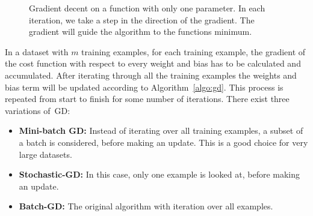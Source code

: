 \begin{figure}
\centering 
\resizebox{0.65\textwidth}{0.4\textwidth}{      

}
\caption{Gradient decent on a function with only one parameter. In each iteration, we take a step in the direction of the gradient. The gradient will guide the algorithm to the functions minimum. }
\label{fig:gradientD}
\end{figure}
\noindent
In a dataset with $m$ training examples, for each training example, the gradient of the cost function with respect to every weight and bias has to be calculated and accumulated. After iterating through all the training examples the weights and bias term will be updated according to Algorithm~\ref{algo:gd}. This process is repeated from start to finish for some number of iterations. There exist three variations of~GD: 
\begin{itemize}
\item \textbf{Mini-batch GD: } Instead of iterating over all training examples, a subset of a batch is considered, before making an update. This is a good choice for very large datasets.
\item \textbf{Stochastic-GD: } In this case, only one example is looked at, before making an update. 
\item \textbf{Batch-GD: } The original algorithm with iteration over all examples. 
\end{itemize}

